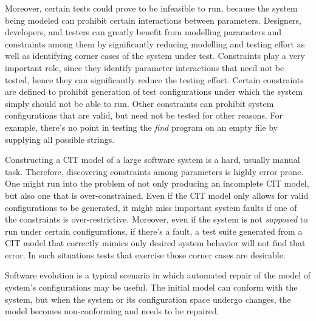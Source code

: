 \begin{tikzborder}{\cite{Gargantini16:validation}}
Moreover, certain tests could prove to be infeasible to run, because the system being modeled can prohibit certain interactions between parameters. 
Designers, developers, and testers can greatly benefit from modelling parameters and constraints among them by significantly reducing modelling and testing effort \cite{Petke15:practical} as well as identifying corner cases of the system under test. 
Constraints play a very important role, since they identify parameter interactions that need not be tested, hence they can significantly reduce the testing effort.
Certain constraints are defined to prohibit generation of test configurations under which the system simply should not be able to run.  
Other constraints can prohibit system configurations that are valid, but need not be tested for other reasons. For example, there's no point in testing the \emph{find} program on an empty file by supplying all possible strings. %

Constructing a CIT model of a large software system is a hard, usually manual task.  Therefore, discovering constraints among parameters is highly error prone. One might run into the problem of not only producing an incomplete CIT model, but also one that is over-constrained. Even if the CIT model only allows for valid configurations to be generated, it might miss important system faults if one of the constraints is over-restrictive. Moreover, even if the system is not \emph{supposed} to run under certain configurations, if there's a fault, a test suite generated from a CIT model that correctly mimics only desired system behavior will not find that error. In such situations tests that exercise those corner cases are desirable. 


Software evolution is a typical scenario in which automated repair of the model of system's configurations may be useful. The initial model can conform with the system, but when the system or its configuration space undergo changes, the model becomes non-conforming and needs to be repaired.


\end{tikzborder}
